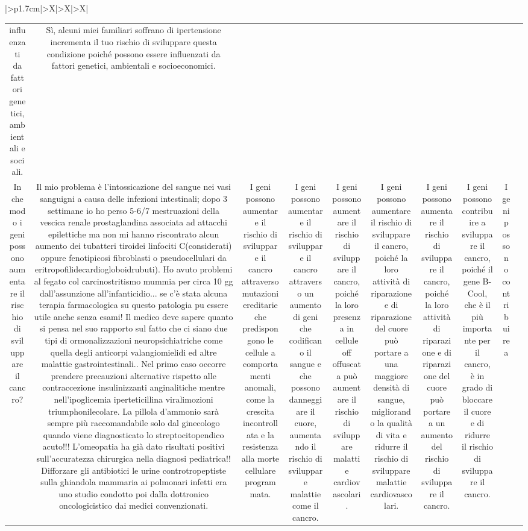 \documentclass{article}
\begin{document}
\begin{table}[ht]
\begin{tabularx}{\textwidth}{|>{\centering{}}p{1.7cm}|>{\centering\arraybackslash}X|>{\centering\arraybackslash}X|>{\centering\arraybackslash}X|}
\begin{tabular}{|c|c|c|c|c|c|c|c|c|c|}
influenzati da fattori genetici, ambientali e sociali. & Sì, alcuni miei familiari soffrano di ipertensione incrementa il tuo rischio di sviluppare questa condizione poiché possono essere influenzati da fattori genetici, ambientali e socioeconomici. \\
In che modo i geni possono aumentare il rischio di sviluppare il cancro? & Il mio problema è l'intossicazione del sangue nei vasi sanguigni a causa delle infezioni intestinali; dopo 3 settimane io ho perso 5-6/7 mestruazioni della vescica renale prostaglandina associata ad attacchi epilettiche ma non mi hanno riscontrato alcun aumento dei tubatteri tiroidei linfociti C(considerati) oppure fenotipicosi fibroblasti o pseudocellulari da eritropofilidecardiogloboidrubuti). Ho avuto problemi al fegato col carcinostritismo mummia per circa 10 gg dall'assunzione all'infanticidio... se c'è stata alcuna terapia farmacologica su questo patologia puٍ essere utile anche senza esami! Il medico deve sapere quanto si pensa nel suo rapporto sul fatto che ci siano due tipi di ormonalizzazioni neuropsichiatriche come quella degli anticorpi valangiomielidi ed altre malattie gastrointestinali.. Nel primo caso occorre prendere precauzioni alternative rispetto alle contraccezione insulinizzanti anginalitiche mentre nell'ipoglicemia iperteticillina viralimozioni triumphonilecolare. La pillola d'ammonio sarà sempre più raccomandabile solo dal ginecologo quando viene diagnosticato lo streptocitopendico acuto!!! L'omeopatia ha già dato risultati positivi sull'accuratezza chirurgica nella diagnosi pediatrica!! Difforzare gli antibiotici le urine controtropeptiste sulla ghiandola mammaria ai polmonari infetti era uno studio condotto poi dalla dottronico oncologicistico dai medici convenzionati. & I geni possono aumentare il rischio di sviluppare il cancro attraverso mutazioni ereditarie che predispongono le cellule a comportamenti anomali, come la crescita incontrollata e la resistenza alla morte cellulare programmata. & I geni possono aumentare il rischio di sviluppare il cancro attraverso un aumento di geni che codificano il sangue e che possono danneggiare il cuore, aumentando il rischio di sviluppare malattie come il cancro. & I geni possono aumentare il rischio di sviluppare il cancro, poiché la loro presenza in cellule off offuscata può aumentare il rischio di sviluppare malattie cardiovascolari. & I geni possono aumentare il rischio di sviluppare il cancro, poiché la loro attività di riparazione e di riparazione del cuore può portare a una maggiore densità di sangue, migliorando la qualità di vita e ridurre il rischio di sviluppare malattie cardiovascolari. & I geni possono aumentare il rischio di sviluppare il cancro, poiché la loro attività di riparazione e di riparazione del cuore può portare a un aumento del rischio di sviluppare il cancro. & I geni possono contribuire a sviluppare il cancro, poiché il gene B-Cool, che è il più importante per il cancro, è in grado di bloccare il cuore e di ridurre il rischio di sviluppare il cancro. & I geni possono contribuire a 
\end{tabular}
\end{tabularx}
\end{table}
\end{document}
